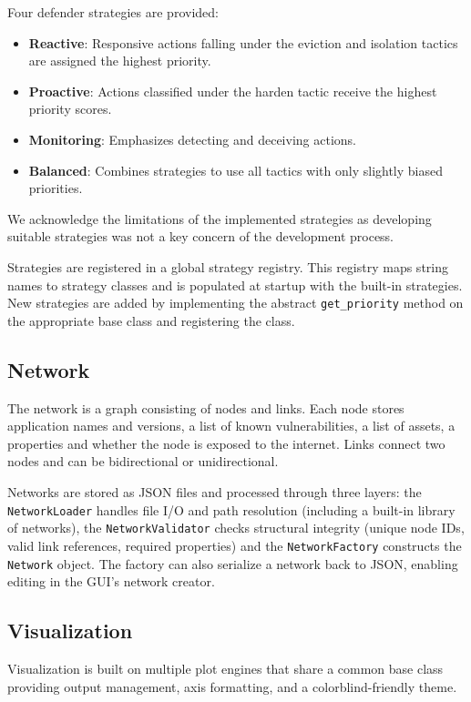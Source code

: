 \documentclass{llncs}
\begin{document}
Four defender strategies are provided:
\begin{itemize}
  \item \textbf{Reactive}: Responsive actions falling under the eviction and isolation tactics are assigned the highest priority.
  \item \textbf{Proactive}: Actions classified under the harden tactic receive the highest priority scores.
  \item \textbf{Monitoring}: Emphasizes detecting and deceiving actions.
  \item \textbf{Balanced}: Combines strategies to use all tactics with only slightly biased priorities.
\end{itemize}
We acknowledge the limitations of the implemented strategies as developing suitable strategies was not a key concern of the development process.

Strategies are registered in a global strategy registry. This registry maps string names to strategy classes and is populated at startup with the built-in strategies. New strategies are added by implementing the abstract \texttt{get\_priority} method on the appropriate base class and registering the class.

\subsection{Network}
The network is a graph consisting of nodes and links. Each node stores application names and versions, a list of known vulnerabilities, a list of assets, a properties and whether the node is exposed to the internet. Links connect two nodes and can be bidirectional or unidirectional.

Networks are stored as JSON files and processed through three layers: the \texttt{NetworkLoader} handles file I/O and path resolution (including a built-in library of networks), the \texttt{NetworkValidator} checks structural integrity (unique node IDs, valid link references, required properties) and the \texttt{NetworkFactory} constructs the \texttt{Network} object. The factory can also serialize a network back to JSON, enabling editing in the GUI's network creator.

\subsection{Visualization}
Visualization is built on multiple plot engines that share a common base class providing output management, axis formatting, and a colorblind-friendly theme.
\end{document}
